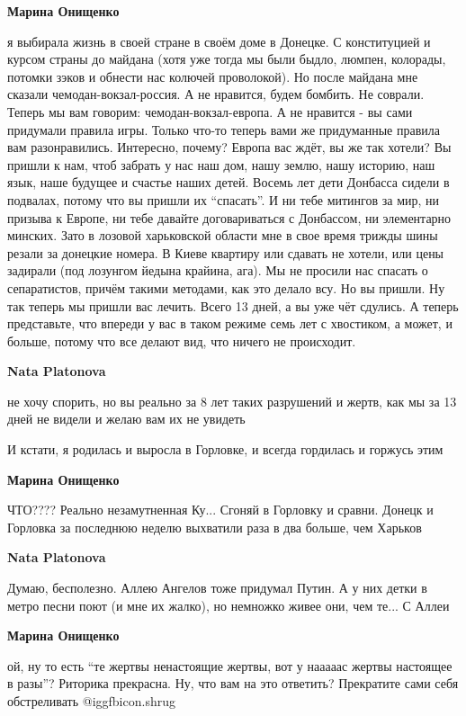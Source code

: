 \begin{itemize}
\begin{itemize}
\textbf{Марина Онищенко} 

я выбирала жизнь в своей стране в своём доме в Донецке. С конституцией и курсом
страны до майдана (хотя уже тогда мы были быдло, люмпен, колорады, потомки
зэков и обнести нас колючей проволокой). Но после майдана мне сказали
чемодан-вокзал-россия. А не нравится, будем бомбить. Не соврали. Теперь мы вам
говорим: чемодан-вокзал-европа. А не нравится - вы сами придумали правила игры.
Только что-то теперь вами же придуманные правила вам разонравились. Интересно,
почему? Европа вас ждёт, вы же так хотели? Вы пришли к нам, чтоб забрать у нас
наш дом, нашу землю, нашу историю, наш язык, наше будущее и счастье наших
детей. Восемь лет дети Донбасса сидели в подвалах, потому что вы пришли их
\enquote{спасать}. И ни тебе митингов за мир, ни призыва к Европе, ни тебе давайте
договариваться с Донбассом, ни элементарно минских. Зато в лозовой харьковской
области мне в свое время трижды шины резали за донецкие номера. В Киеве
квартиру или сдавать не хотели, или цены задирали (под лозунгом йедына крайина,
ага). Мы не просили нас спасать о сепаратистов, причём такими методами, как это
делало всу. Но вы пришли. Ну так теперь мы пришли вас лечить. Всего 13 дней, а
вы уже чёт сдулись. А теперь представьте, что впереди у вас в таком режиме семь
лет с хвостиком, а может, и больше, потому что все делают вид, что ничего не
происходит.

\textbf{Nata Platonova} 

не хочу спорить, но вы реально за 8 лет таких разрушений и жертв, как мы за 13
дней не видели и желаю вам их не увидеть

И кстати, я родилась и выросла в Горловке, и всегда гордилась и горжусь этим

\textbf{Марина Онищенко} 

ЧТО???? Реально незамутненная Ку... Сгоняй в Горловку и сравни. Донецк и
Горловка за последнюю неделю выхватили раза в два больше, чем Харьков

\textbf{Nata Platonova} 

Думаю, бесполезно. Аллею Ангелов тоже придумал Путин. А у них детки в метро
песни поют (и мне их жалко), но немножко живее они, чем те... С Аллеи

\textbf{Марина Онищенко} 

ой, ну то есть \enquote{те жертвы ненастоящие жертвы, вот у нааааас жертвы настоящее в
разы}? Риторика прекрасна. Ну, что вам на это ответить? Прекратите сами себя
обстреливать  @igg{fbicon.shrug} 


\end{itemize}
\end{itemize}
